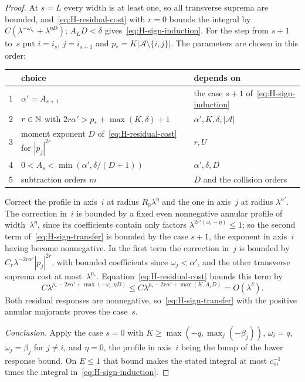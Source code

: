 \begin{proof}
At $s=L$ every width is at least one, so all transverse suprema are bounded, and~\eqref{eq:H-residual-cost} with $r=0$ bounds the integral by $C(\lambda^{-\omega_{i_L}}+\lambda^{\eta D})$; $A_LD<\delta$ gives~\eqref{eq:H-sign-induction}. For the step from $s+1$ to~$s$ put $i=i_s$, $j=i_{s+1}$ and $p_*=K|\mathcal A\setminus\{i,j\}|$. The parameters are chosen in this order:
\begin{center}
\small
\begin{tabular}{lll}
\toprule
& choice & depends on\\
\midrule
1 & $\alpha'=A_{s+1}$ & the case $s+1$ of~\eqref{eq:H-sign-induction}\\
2 & $r\in\mathbb{N}$ with $2r\alpha'>p_*+\max(K,\delta)+1$ & $\alpha',K,\delta,|\mathcal A|$\\
3 & moment exponent $D$ of~\eqref{eq:H-residual-cost} for $|p_j|^{2r}$ & $r,U$\\
4 & $0<A_s<\min(\alpha',\delta/(D+1))$ & $\alpha',\delta,D$\\
5 & subtraction orders $m$ & $D$ and the collision orders\\
\bottomrule
\end{tabular}
\end{center}
Correct the profile in axis~$i$ at radius $R_0\lambda^\eta$ and the one in axis~$j$ at radius $\lambda^{\alpha'}$. The correction in~$i$ is bounded by a fixed even nonnegative annular profile of width~$\lambda^\eta$, since its coefficients contain only factors $\lambda^{2r'(\omega_i-\eta)}\le1$; so the second term of~\eqref{eq:H-sign-transfer} is bounded by the case $s+1$, the exponent in axis~$i$ having become nonnegative. In the first term the correction in~$j$ is bounded by $C_r\lambda^{-2r\alpha'}|p_j|^{2r}$, with bounded coefficients since $\omega_j<\alpha'$, and the other transverse suprema cost at most~$\lambda^{p_*}$. Equation~\eqref{eq:H-residual-cost} bounds this term by
\begin{equation*}
C\lambda^{p_*-2r\alpha'+\max(-\omega_i,\eta D)}
\le C\lambda^{p_*-2r\alpha'+\max(K,A_s D)}
=O(\lambda^\delta).
\end{equation*}
Both residual responses are nonnegative, so~\eqref{eq:H-sign-transfer} with the positive annular majorants proves the case~$s$.

\emph{Conclusion.} Apply the case $s=0$ with $K\ge\max(-q,\max_j(-\beta_j))$, $\omega_i=q$, $\omega_j=\beta_j$ for $j\ne i$, and $\eta=0$, the profile in axis~$i$ being the bump of the lower response bound. On $E\le1$ that bound makes the stated integral at most $c_m^{-1}$ times the integral in~\eqref{eq:H-sign-induction}.
\end{proof}

